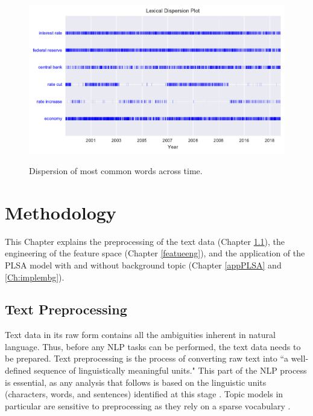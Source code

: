 \documentclass[11pt,a4paper,english,oneside]{book}
\numberwithin{equation}{chapter}
\begin{document}
\begin{figure}
	\caption{Dispersion of most common words across time.}
	\centering
	\includegraphics[scale=1]{Images/dispersionplot.pdf}
	\label{dispersion}
\end{figure}

	


\section{Methodology}\label{methodology}

This Chapter explains the preprocessing of the text data (Chapter  \ref{preprocessing}), the engineering of the feature space (Chapter \ref{featueeng}), and the application of the PLSA model with and without background topic (Chapter \ref{appPLSA} and \ref{Ch:implembg}).


\subsection{Text Preprocessing}\label{preprocessing}
Text data in its raw form contains all the ambiguities inherent in natural language. Thus, before any NLP tasks can be performed, the text data needs to be prepared. Text preprocessing is the process of converting raw text into ``a well-defined sequence of linguistically meaningful units." This part of the NLP process is essential, as any analysis that follows is based on the linguistic units (characters, words, and sentences) identified at this stage \cite[p. 9]{Palmer.2010}. Topic models in particular are sensitive to preprocessing as they rely on a sparse vocabulary \cite[p. 288]{Schofield.2016}.
\end{document}
